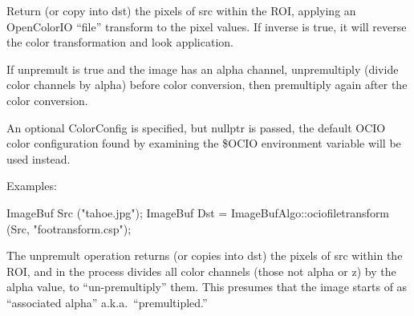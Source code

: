  
Return (or copy into {\cf dst}) the pixels of {\cf src} within the ROI,
applying an OpenColorIO ``file'' transform to the pixel values. If {\cf inverse} is {\cf
true}, it will reverse the color transformation and look application.

If {\cf unpremult} is {\cf true} and the image has an alpha channel,
unpremultiply (divide color channels by alpha) before color conversion, then
premultiply again after the color conversion.

An optional {\cf ColorConfig} is specified, but {\cf nullptr} is passed, the
default OCIO color configuration found by examining the {\cf \$OCIO}
environment variable will be used instead.

\smallskip
\noindent Examples:
\begin{code}
    ImageBuf Src ("tahoe.jpg");
    ImageBuf Dst = ImageBufAlgo::ociofiletransform (Src, "footransform.csp");
\end{code}
\apiend


 

The {\cf unpremult} operation returns (or copies into dst) the pixels of src within the ROI, and in the process
divides all color channels (those not alpha or z)
by the alpha value, to ``un-premultiply'' them.  This presumes that the
image starts of as ``associated alpha'' a.k.a.\ ``premultipled.''

